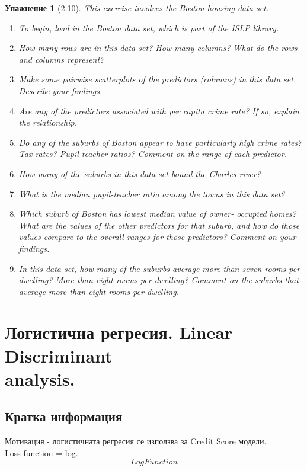 \documentclass{article}
\newtheorem{exercise}[subsubsection]{Упажнение}
\begin{document}
	\begin{exercise}[2.10]
		This exercise involves the Boston housing data set.
		\begin{enumerate}[label=(\alph*)]
		\item To begin, load in the Boston data set, which is part of the ISLP
		library.
		\item How many rows are in this data set? How many columns? What
		do the rows and columns represent?
		\item Make some pairwise scatterplots of the predictors (columns) in
		this data set. Describe your findings.
		\item Are any of the predictors associated with per capita crime rate?
		If so, explain the relationship. 
		\item Do any of the suburbs of Boston appear to have particularly
		high crime rates? Tax rates? Pupil-teacher ratios? Comment on
		the range of each predictor.		 
		\item How many of the suburbs in this data set bound the Charles
		river?		 
		\item What is the median pupil-teacher ratio among the towns in this
		data set?		 
		\item Which suburb of Boston has lowest median value of owner-
		occupied homes? What are the values of the other predictors
		for that suburb, and how do those values compare to the overall
		ranges for those predictors? Comment on your findings.	 	 
		\item In this data set, how many of the suburbs average more than
		seven rooms per dwelling? More than eight rooms per dwelling?
		Comment on the suburbs that average more than eight rooms
		per dwelling.
		\end{enumerate}
	\end{exercise}
	
		
		
		
\newpage	
\section{Логистична регресия. Linear Discriminant \\ analysis.}




	\subsection{Кратка информация}
	Мотивация - логистичната регресия се използва за Credit Score модели.\\
	Loss function = log. \\
	$$Log Function $$
	
\end{document}
